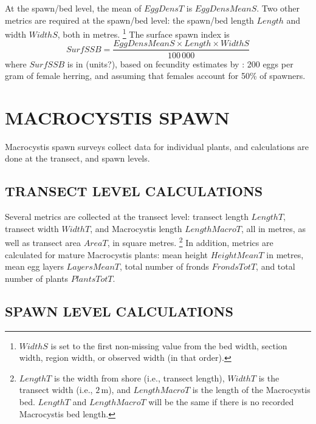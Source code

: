 \documentclass[12pt]{article}
\begin{document}
At the spawn/bed level, the mean of $EggDensT$ is $EggDensMeanS$.
Two other metrics are required at the spawn/bed level: the spawn/bed length $Length$ and width $WidthS$, both in metres.%
\footnote{$WidthS$ is set to the first non-missing value from the bed width, section width, region width, or observed width (in that order).}
The surface spawn index is
\begin{equation}
SurfSSB = \frac{EggDensMeanS \times Length \times WidthS} {100\,000}
\label{eqBiomassSurf}
\end{equation}
where $SurfSSB$ is in (units?), based on fecundity estimates by \citet{Hay1985}: 200 eggs per gram of female herring, and assuming that females account for 50\% of spawners.

\section{MACROCYSTIS SPAWN}

Macrocystis spawn surveys collect data for individual plants, and calculations are done at the transect, and spawn levels.

\subsection{TRANSECT LEVEL CALCULATIONS}

Several metrics are collected at the transect level: transect length $LengthT$, transect width $WidthT$, and Macrocystis length $LengthMacroT$, all in metres, as well as transect area $AreaT$, in square metres.%
\footnote{$LengthT$ is the width from shore (i.e., transect length), $WidthT$ is the transect width (i.e., $2\,\text{m}$), and $LengthMacroT$ is the length of the Macrocystis bed.
$LengthT$ and $LengthMacroT$ will be the same if there is no recorded Macrocystis bed length.}
In addition, metrics are calculated for mature Macrocystis plants: mean height $HeightMeanT$ in metres, mean egg layers $LayersMeanT$, total number of fronds $FrondsTotT$, and total number of plants $PlantsTotT$.

\subsection{SPAWN LEVEL CALCULATIONS}
\end{document}
